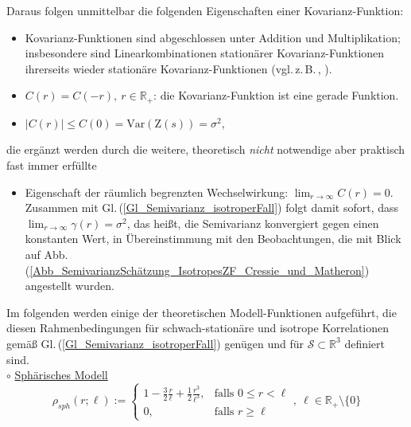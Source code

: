 Daraus folgen unmittelbar die folgenden Eigenschaften 
einer Kovarianz-Funktion:

\begin{itemize}[topsep=2pt,parsep=1pt,itemsep=0.5pt]
\item[0) ] Kovarianz-Funktionen sind abgeschlossen unter
Addition und Multiplikation; insbesondere sind
Linearkombinationen stationärer Kovarianz-Funktionen
ihrerseits wieder stationäre Kovarianz-Funktionen
(vgl.\,z.\,B.\,\cite[Kap.\,4.2]{Rasmussen2006}, 
\cite[Kap.\,18.2]{Murphy2023}).
\item[1) ] $C(r) = C(-r),\ r \in \mathbb{R}_+$: die 
Kovarianz-Funktion ist eine gerade Funktion.
\item[2) ] $\vert C(r)\vert \leq C(0) = \mathrm{Var} 
\left( \mathrm{Z}(s) \right) = \sigma^2$,
\end{itemize}
die ergänzt werden durch die weitere, theoretisch \textit{nicht} 
notwendige aber praktisch fast immer erfüllte 
\begin{itemize}[topsep=2pt,parsep=1pt,itemsep=0.5pt]
\item[3) ] Eigenschaft 
der räumlich begrenzten Wechselwirkung: $\lim_{r \longrightarrow \infty} C(r) = 0$. Zusammen
 mit Gl.\,(\ref{Gl_Semivarianz_isotroperFall}) folgt damit sofort, 
dass $\lim_{r \longrightarrow \infty} \gamma(r) = \sigma^2$, das heißt,
die Semivarianz konvergiert gegen einen konstanten Wert, 
in Übereinstimmung mit den Beobachtungen, die mit Blick auf 
Abb.\,(\ref{Abb_SemivarianzSchätzung_IsotropesZF_Cressie_und_Matheron}) 
angestellt wurden. 
\end{itemize}  

\vspace*{3pt}
Im folgenden werden einige der theoretischen Modell-Funktionen
aufgeführt, die diesen Rahmenbedingungen für schwach-stationäre
und isotrope Korrelationen gemäß 
Gl.\,(\ref{Gl_Semivarianz_isotroperFall}) genügen und für $\mathcal{S} \subset \mathbb{R}^3$ 
definiert sind.\\

$\circ$ \underline{Sphärisches Modell}
\begin{equation}
\label{Gl_SphärischesModell}
\rho_{sph}(r; \ell) := \left\{\begin{array}{ll} 1- \frac{3}{2} \frac{r}{\ell} 
+ \frac{1}{2}\frac{r^3}{\ell^3}, & \textrm{falls } 0 \leq r < \ell \\
0, & \textrm{falls\ } r \geq \ell \end{array}\right.,\ 
\ell \in \mathbb{R}_+ \setminus \lbrace 0 \rbrace
\end{equation}


